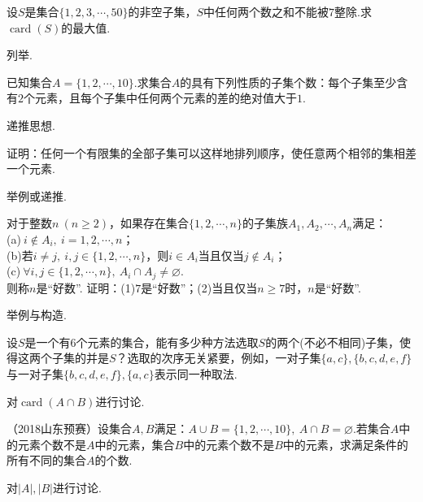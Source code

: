 \documentclass[lang=cn, zihao=4.5]{elegantbook}
\DeclareMathOperator{\card}{card}
\begin{document}
\begin{example} %
	设$S$是集合$\{ 1,2,3,\cdots ,50 \}$的非空子集，$S$中任何两个数之和不能被$7$整除.求$\card (S)$的最大值.
\end{example}
\begin{hint}
	列举.
\end{hint}

\begin{example} %
	已知集合$A = \{ 1,2, \cdots ,10 \}$.求集合$A$的具有下列性质的子集个数：每个子集至少含有$2$个元素，且每个子集中任何两个元素的差的绝对值大于$1$.
\end{example}
\begin{hint}
	递推思想.
\end{hint}

\begin{example} %
	证明：任何一个有限集的全部子集可以这样地排列顺序，使任意两个相邻的集相差一个元素.
\end{example}
\begin{hint}
	举例或递推.
\end{hint}

\begin{example} %
	对于整数$n~(n \geq 2)$，如果存在集合$\{ 1,2, \cdots ,n \}$的子集族$A_1,A_2, \cdots ,A_n$满足： \\
	(a)$~i \notin A_i,~i=1,2,\cdots ,n$； \\
	(b)若$i \neq j,~ i,j \in \{ 1,2, \cdots ,n \}$，则$i \in A_i$当且仅当$j \notin A_i$； \\
	(c)$~\forall i,j \in \{ 1,2,\cdots ,n \},~ A_i \cap A_j \neq \varnothing$. \\
	则称$n$是“好数”. 证明：(1)$7$是“好数”；(2)当且仅当$n \geq 7$时，$n$是“好数”.
\end{example}
\begin{hint}
	举例与构造.
\end{hint}

\begin{example} %
	设$S$是一个有$6$个元素的集合，能有多少种方法选取$S$的两个(不必不相同)子集，使得这两个子集的并是$S$？选取的次序无关紧要，例如，一对子集$\{ a,c \},\{ b,c,d,e,f \}$与一对子集$\{ b,c,d,e,f \},\{ a,c \}$表示同一种取法.
\end{example}
\begin{hint}
	对$\card{(A \cap B)}$进行讨论.
\end{hint}

\begin{example} %
	（2018山东预赛）设集合$A,B$满足：$A \cup B = \{ 1,2,\cdots ,10 \}, ~A \cap B = \varnothing$.若集合$A$中的元素个数不是$A$中的元素，集合$B$中的元素个数不是$B$中的元素，求满足条件的所有不同的集合$A$的个数.
\end{example}
\begin{hint}
	对$|A|,|B|$进行讨论.
\end{hint}
\end{document}
